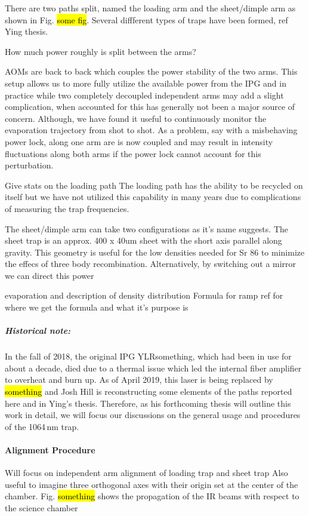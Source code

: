 There are two paths split, named the loading arm and the sheet/dimple arm as shown in Fig. \hl{some fig}.
Several diffferent types of traps have been formed, ref Ying thesis. 

How much power roughly is split between the arms?

AOMs are back to back which couples the power stability of the two arms. 
This setup allows us to more fully utilize the available power from the IPG and in practice while two completely decoupled independent arms may add a slight complication, when accounted for this has generally not been a major source of concern. 
Although, we have found it useful to continuously monitor the evaporation trajectory from shot to shot. 
As a problem, say with a misbehaving power lock, along one arm are is now coupled and may result in intensity fluctuations along both arms if the power lock cannot account for this perturbation.

Give stats on the loading path The loading path has the ability to be recycled on itself but we have not utilized this capability in many years due to complications of measuring the trap frequencies. 

The sheet/dimple arm can take two configurations as it's name suggests. The sheet trap is an approx. 400 x 40um sheet with the short axis parallel along gravity. This geometry is useful for the low densities needed for Sr 86 to minimize the effecs of three body recombination. Alternatively, by switching out a mirror we can direct this power

evaporation and description of density distribution
Formula for ramp
ref for where we get the formula and what it's purpose is

\subparagraph{Historical note:}
In the fall of 2018, the original IPG YLRsomething, which had been in use for about a decade, died due to a thermal issue which led the internal fiber amplifier to overheat and burn up.
As of April 2019, this laser is being replaced by \hl{something} and Josh Hill is reconstructing some elements of the paths reported here and in Ying's thesis.
Therefore, as his forthcoming thesis will outline this work in detail, we will focus our discussions on the general usage and procedures of the 1064\,nm trap.


\paragraph{Alignment Procedure} \label{sssec:1064_align}
Will focus on independent arm alignment of loading trap and sheet trap
Also useful to imagine three orthogonal axes with their origin set at the center of the chamber.
Fig. \hl{something} shows the propagation of the IR beams with respect to the science chamber


